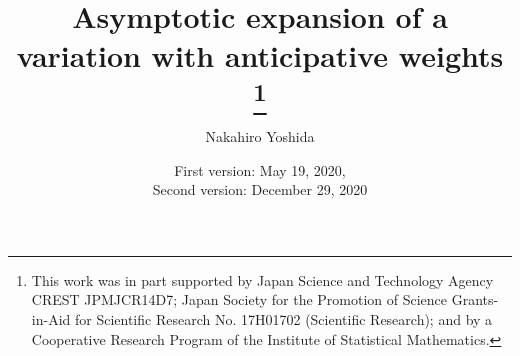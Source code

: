 \documentclass[a4paper,12pt]{article}
\numberwithin{equation}{section}
\numberwithin{equation}{section}
\begin{document}

\title{Asymptotic expansion of a variation with anticipative weights %
\footnote{
This work was in part supported by 
Japan Science and Technology Agency CREST JPMJCR14D7; 
Japan Society for the Promotion of Science Grants-in-Aid for Scientific Research 
No. 17H01702 (Scientific Research);  
and by a Cooperative Research Program of the Institute of Statistical Mathematics. %
}
}
\author{Nakahiro Yoshida}
\date{First version: May 19, 2020, \\
Second version: December 29, 2020
}
\end{document}
